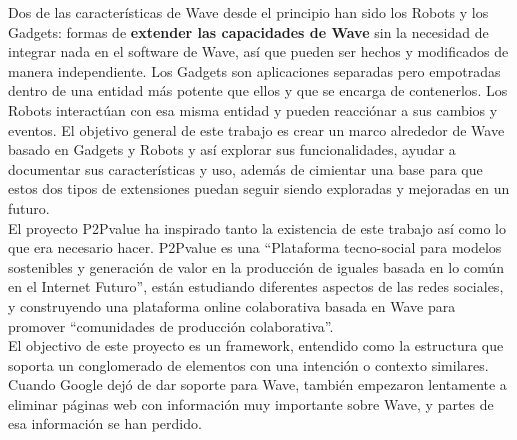 Dos de las características de Wave desde el principio han sido los Robots y los Gadgets: formas de \textbf{extender las capacidades de Wave} sin la necesidad de integrar nada en el software de Wave, así que pueden ser hechos y modificados de manera independiente. Los Gadgets son aplicaciones separadas pero empotradas dentro de una entidad más potente que ellos y que se encarga de contenerlos. Los Robots interactúan con esa misma entidad y pueden reacciónar a sus cambios y eventos. El objetivo general de este trabajo es crear un marco alrededor de Wave basado en Gadgets y Robots y así explorar sus funcionalidades, ayudar a documentar sus características y uso, además de cimientar una base para que estos dos tipos de extensiones puedan seguir siendo exploradas y mejoradas en un futuro.\\[.2cm]
El proyecto P2Pvalue \cite{ref:p2pvalue} ha inspirado tanto la existencia de este trabajo así como lo que era necesario hacer. P2Pvalue es una ``Plataforma tecno-social para modelos sostenibles y generación de valor en la producción de iguales basada en lo común en el Internet Futuro'', están estudiando diferentes aspectos de las redes sociales, y construyendo una plataforma online colaborativa basada en Wave para promover ``comunidades de producción colaborativa''.\\[.2cm]
El objectivo de este proyecto es un framework, entendido como la estructura que soporta un conglomerado de elementos con una intención o contexto similares. Cuando Google dejó de dar soporte para Wave, también empezaron lentamente a eliminar páginas web con información muy importante sobre Wave, y partes de esa información se han perdido.

